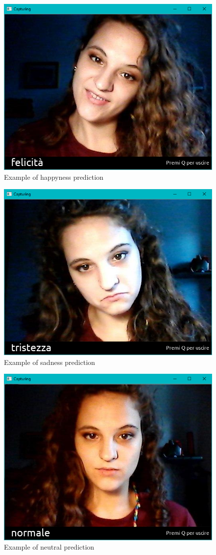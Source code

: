 \documentclass[10pt,twocolumn,letterpaper]{article}
\begin{document}
\begin{figure}[H]
   \centering
   \includegraphics[width=0.8\linewidth]{./immagini/ele_felice.png}
   \caption{Example of happyness prediction}
\end{figure}

\begin{figure}[H]
   \centering
   \includegraphics[width=0.8\linewidth]{./immagini/ele_triste.png}
   \caption{Example of sadness prediction}
\end{figure}

\begin{figure}[H]
   \centering
   \includegraphics[width=0.8\linewidth]{./immagini/ele_neutrale.png}
   \caption{Example of neutral prediction}
\end{figure}
\end{document}
